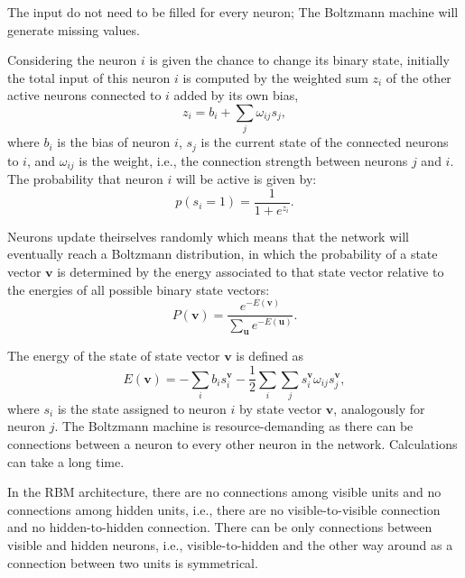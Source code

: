 The input do not need to be filled for every neuron; The Boltzmann machine will generate missing values.

Considering the neuron $i$ is given the chance to change its binary state, initially the total input of this neuron $i$ is computed by the weighted sum $z_{i}$ of the other active neurons connected to $i$ added by its own bias,
\begin{equation}
    \label{eq:rubik-input-weightedsum}
    z_{i} = b_{i} + \sum_{j} \omega_{ij} s_{j},
\end{equation}
where $b_{i}$ is the bias of neuron $i$, $s_{j}$ is the current state of the connected neurons to $i$, and $\omega_{ij}$ is the weight, i.e., the connection strength between neurons $j$ and $i$.
The probability that neuron $i$ will be active is given by:
\begin{equation}
    \label{eq:rubik-neuron-prob}
    p(s_{i} = 1) = \frac{1}{1 + e^{z_{i}}}.
\end{equation}

Neurons update theirselves randomly which means that the network will eventually reach a Boltzmann distribution, in which the probability of a state vector $\mathbf{v}$ is determined by the energy associated to that state vector relative to the energies of all possible binary state vectors:
\begin{equation}
    \label{eq:rubik-boltzmann-distri}
    P(\mathbf{v}) = \frac{e^{-E(\mathbf{v})}}{\sum_{\mathbf{u}} e^{-E(\mathbf{u})}}.
\end{equation}

The energy of the state of state vector $\mathbf{v}$ is defined as
\begin{equation}
    \label{eq:rubik-state-energy-bm}
    E(\mathbf{v}) = -\sum_{i} b_{i} s^{\mathbf{v}}_{i} - \frac{1}{2} \sum_{i} \sum_{j} s^{\mathbf{v}}_{i} \omega_{ij} s^{\mathbf{v}}_{j},
\end{equation}
where $s_{i}$ is the state assigned to neuron $i$ by state vector $\mathbf{v}$, analogously for neuron $j$.
The Boltzmann machine is resource-demanding as there can be connections between a neuron to every other neuron in the network.
Calculations can take a long time.

In the RBM architecture, there are no connections among visible units and no connections among hidden units, i.e., there are no visible-to-visible connection and no hidden-to-hidden connection.
There can be only connections between visible and hidden neurons, i.e., visible-to-hidden and the other way around as a connection between two units is symmetrical.

